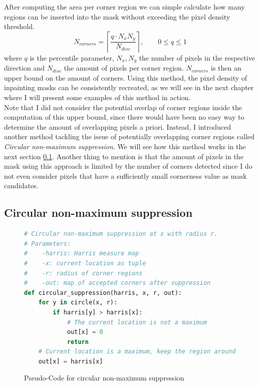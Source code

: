 After computing the area per corner region we can simple calculate how many regions can be inserted
into the mask without exceeding the pixel density threshold.
\begin{equation}
    N_{corners} = \left\lceil \frac{q \cdot N_xN_y}{N_{disc}} \right\rceil,\qquad0\leq q\leq 1 
\end{equation}
where $q$ is the percentile parameter, $N_x, N_y$ the number of pixels in the respective direction
and $N_{disc}$ the amount of pixels per corner region. $N_{corners}$ is then an upper bound on the
amount of corners.
Using this method, the pixel density of inpainting masks can be consistently recreated, as we will
see in the next chapter where I will present some examples of this method in action.\\
Note that I did not consider the potential overlap of corner regions inside the
computation of this upper bound, since there would have been no easy way to determine the amount of
overlapping pixels a priori.
Instead, I introduced another method tackling the issue of potentially overlapping corner regions
called \textit{Circular non-maximum suppression}. We will see how this method
works in the next section \ref{sub:Suppression}.
Another thing to mention is that the amount of pixels in the mask using this approach is limited by
the number of corners detected since I do not even consider pixels that have a sufficiently small
cornerness value as mask candidates.

\subsection{Circular non-maximum suppression}\label{sub:Suppression}
\begin{figure}[t]
    \begin{lstlisting}[language=Python]
# Circular non-maximum suppression at x with radius r.
# Parameters:
#    -harris: Harris measure map
#    -x: current location as tuple
#    -r: radius of corner regions
#    -out: map of accepted corners after suppression
def circular_suppression(harris, x, r, out):
    for y in circle(x, r):
        if harris[y] > harris[x]:
            # The current location is not a maximum
            out[x] = 0
            return
    # Current location is a maximum, keep the region around it
    out[x] = harris[x]
    \end{lstlisting}
    \caption{Pseudo-Code for circular non-maximum suppression}
\end{figure}

